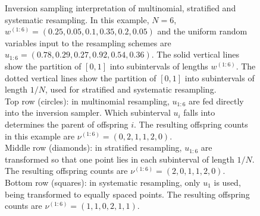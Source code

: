 \begin{figure}
\caption[Inversion sampling for multinomial, stratified and systematic resampling]{Inversion sampling interpretation of multinomial, stratified and systematic resampling.
In this example, $N=6$, $w^{(1:6)} = (0.25,0.05,0.1,0.35,0.2,0.05)$ and the uniform random variables input to the resampling schemes are $u_{1:6} = (0.78, 0.29, 0.27, 0.92, 0.54, 0.36)$.
The solid vertical lines show the partition of $[0,1]$ into subintervals of lengths $w^{(1:6)}$.
The dotted vertical lines show the partition of $[0,1]$ into subintervals of length $1/N$, used for stratified and systematic resampling.\\
Top row (circles): in multinomial resampling, $u_{1:6}$ are fed directly into the inversion sampler. Which subinterval $u_i$ falls into determines the parent of offspring $i$. The resulting offspring counts in this example are $\nu^{(1:6)} = (0,2,1,1,2,0)$.\\
Middle row (diamonds): in stratified resampling, $u_{1:6}$ are transformed so that one point lies in each subinterval of length $1/N$. The resulting offspring counts are $\nu^{(1:6)} = (2,0,1,1,2,0)$.\\
Bottom row (squares): in systematic resampling, only $u_1$ is used, being transformed to equally spaced points. The resulting offspring counts are $\nu^{(1:6)} = (1,1,0,2,1,1)$.}
\label{fig:inv_resampling}
\end{figure}
